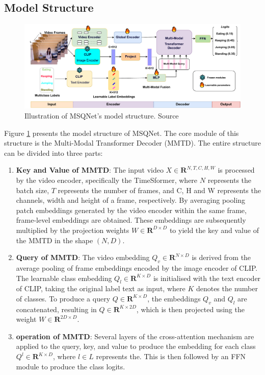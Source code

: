 \subsection{Model Structure}
\begin{figure}[ht]
    \centering
    \includegraphics[width=1.0\textwidth]{assets/charts_rw/MSQNet}
    \caption[Model Structure of MSQNet]{Illustration of MSQNet's model structure. Source \parencite{mondal2023msqnet}}
    \label{fig:discussion_msqnet}
\end{figure}

Figure \ref{fig:discussion_msqnet} presents the model structure of MSQNet. The core module of this structure is the Multi-Modal Transformer Decoder (MMTD). The entire structure can be divided into three parts: 

\begin{enumerate}
    \item \textbf{Key and Value of MMTD}: The input video $X \in \mathbf{R}^{N, T, C, H, W}$ is processed by the video encoder, specifically the TimeSformer, where $N$ represents the batch size, $T$ represents the number of frames, and C, H and W represents the channels, width and height of a frame, respectively. By averaging pooling patch embeddings generated by the video encoder within the same frame, frame-level embeddings are obtained. These embeddings are subsequently multiplied by the projection weights $W \in \mathbf{R}^{D \times D}$ to yield the key and value of the MMTD in the shape $(N, D)$. 
    \item \textbf{Query of MMTD}: The video embedding $Q_v \in \mathbf{R}^{N \times D}$ is derived from the average pooling of frame embeddings encoded by the image encoder of CLIP. The learnable class embedding $Q_l \in \mathbf{R}^{K \times D}$ is initialised with the text encoder of CLIP, taking the original label text as input, where $K$ denotes the number of classes. To produce a query $Q \in \mathbf{R}^{K \times D}$, the embeddings $Q_v$ and $Q_l$ are concatenated, resulting in $Q \in \mathbf{R}^{K \times 2D}$, which is then projected using the weight $W \in \mathbf{R}^{2D \times D}$. 
    \item \textbf{operation of MMTD}: Several layers of the cross-attention mechanism are applied to the query, key, and value to produce the embedding for each class $Q^l \in \mathbf{R}^{K \times D}$, where $l \in L$ represents the. This is then followed by an FFN module to produce the class logits.
\end{enumerate}

